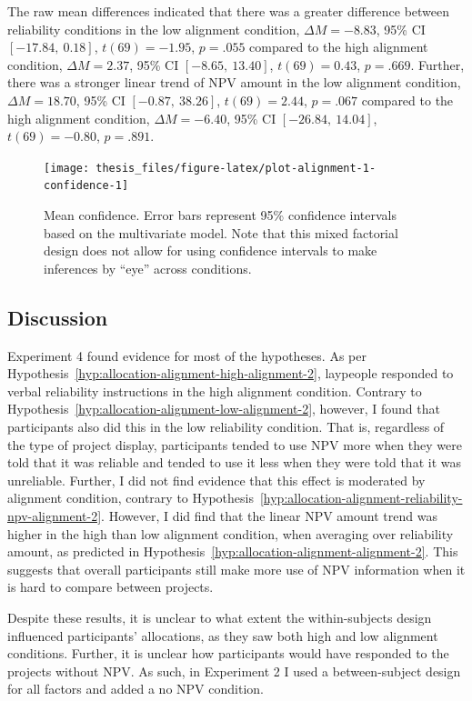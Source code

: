 \documentclass[a4paper, nobind, dvipsnames]{templates/ociamthesis}
\theoremstyle{definition}
\theoremstyle{definition}
\theoremstyle{definition}
\theoremstyle{definition}
\theoremstyle{remark}
\begin{document}
The raw mean differences indicated that there was a greater difference between
reliability conditions in the low alignment condition,
\(\Delta M = -8.83\), 95\% CI \([-17.84,~0.18]\), \(t(69) = -1.95\), \(p = .055\) compared to the high alignment
condition, \(\Delta M = 2.37\), 95\% CI \([-8.65,~13.40]\), \(t(69) = 0.43\), \(p = .669\). Further, there was
a stronger linear trend of NPV amount in the low alignment condition,
\(\Delta M = 18.70\), 95\% CI \([-0.87,~38.26]\), \(t(69) = 2.44\), \(p = .067\) compared to the high alignment
condition, \(\Delta M = -6.40\), 95\% CI \([-26.84,~14.04]\), \(t(69) = -0.80\), \(p = .891\).



\begin{figure}
\texttt{[image: thesis\_files/figure-latex/plot-alignment-1-confidence-1]} \caption{Mean confidence. Error bars represent 95\% confidence intervals based on the multivariate model. Note that this mixed factorial design does not allow for using confidence intervals to make inferences by ``eye'' across conditions.}\label{fig:plot-alignment-1-confidence}
\end{figure}

\subsection{Discussion}

Experiment 4 found evidence for most of the hypotheses. As per
Hypothesis~\ref{hyp:allocation-alignment-high-alignment-2}, laypeople responded
to verbal reliability instructions in the high alignment condition. Contrary to
Hypothesis~\ref{hyp:allocation-alignment-low-alignment-2}, however, I found that
participants also did this in the low reliability condition. That is, regardless
of the type of project display, participants tended to use NPV more when they
were told that it was reliable and tended to use it less when they were told
that it was unreliable. Further, I did not find evidence that this effect is
moderated by alignment condition, contrary to
Hypothesis~\ref{hyp:allocation-alignment-reliability-npv-alignment-2}. However,
I did find that the linear NPV amount trend was higher in the high than low
alignment condition, when averaging over reliability amount, as predicted in
Hypothesis~\ref{hyp:allocation-alignment-alignment-2}. This suggests that
overall participants still make more use of NPV information when it is hard to
compare between projects.

Despite these results, it is unclear to what extent the within-subjects design
influenced participants' allocations, as they saw both high and low alignment
conditions. Further, it is unclear how participants would have responded to the
projects without NPV. As such, in Experiment 2 I used a between-subject design
for all factors and added a no NPV condition.
\end{document}
